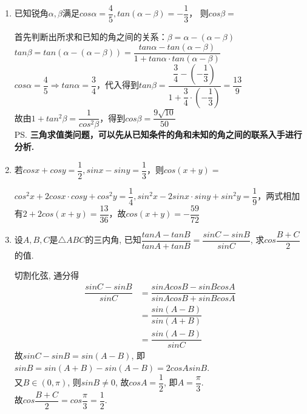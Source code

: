 \begin{enumerate}
        \item 已知锐角$\alpha, \beta$满足$cos\alpha = \dfrac{4}{5}, tan(\alpha - \beta) = -\dfrac{1}{3}$， 则$cos\beta=$ 
        \begin{jieda}
            首先判断出所求和已知的角之间的关系：$\beta = \alpha - (\alpha - \beta)$ \\
            $tan\beta = tan(\alpha - (\alpha - \beta)) = \dfrac{tan\alpha - tan(\alpha - \beta)}{1 + tan\alpha \cdot tan(\alpha - \beta)}$ \\
            $cos\alpha = \dfrac{4}{5} \Rightarrow tan\alpha = \dfrac{3}{4}$，代入得到$tan\beta = \dfrac{\dfrac{3}{4} - \left(-\dfrac{1}{3}\right)}{1 + \dfrac{3}{4} \cdot \left (-\dfrac{1}{3} \right)} = \dfrac{13}{9}$\\
            故由$1 + tan^2\beta = \dfrac{1}{cos^2\beta}$，得到$cos\beta = \dfrac{9\sqrt{10}}{50}$ \\
            \ps \textbf{三角求值类问题，可以先从已知条件的角和未知的角之间的联系入手进行分析.}
        \end{jieda}
        \item 若$cosx+cosy = \dfrac{1}{2}, sinx - siny = \dfrac{1}{3}$，则$cos(x+y) = $
        \begin{jieda}
            $cos^2x+2cosx \cdot cosy + cos^2y = \dfrac{1}{4}, sin^2x - 2sinx \cdot siny + sin^2y = \dfrac{1}{9}$，两式相加有$2 + 2cos(x+y) = \dfrac{13}{36}$，故$cos(x+y) = -\dfrac{59}{72}$
        \end{jieda}
        \item 设$A,B,C$是$\triangle{ABC}$的三内角, 已知$\dfrac{tan{A}-tan{B}}{tan{A}+tan{B}}=\dfrac{sin{C}-sin{B}}{sin{C}}$, 求$cos\dfrac{B+C}{2}$的值. 
        \begin{jieda}
        切割化弦, 通分得
        \begin{align*}
        \dfrac{sin{C}-sin{B}}{sin{C}}
        & =\dfrac{sin{A}cos{B}-sin{B}cos{A}}{sin{A}cos{B}+sin{B}cos{A}}\\
        & =\dfrac{sin(A-B)}{sin(A+B)}\\
        & =\dfrac{sin(A-B)}{sin{C}}
        \end{align*}
        故$sin{C}-sin{B}=sin(A-B)$, 即$sin{B}=sin(A+B)-sin(A-B)=2cos{A}sin{B}$. \\
        又$B\in(0,\pi)$, 则$sin{B}\neq 0$, 故$cos{A}=\dfrac{1}{2}$, 即$A=\dfrac{\pi}{3}$. \\
        故$cos\dfrac{B+C}{2}=cos\dfrac{\pi}{3}=\dfrac{1}{2}$. 
        \end{jieda}

\end{enumerate}
